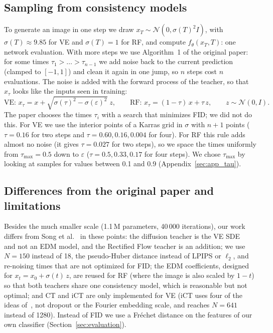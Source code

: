 \documentclass{article}
\begin{document}
\subsection{Sampling from consistency models}
\label{sec:sampling}

To generate an image in one step we draw $x_T \sim \mathcal{N}(0, \sigma(T)^2 I)$,
with $\sigma(T) \approx 9.85$ for VE and $\sigma(T) = 1$ for RF, and compute
$f_\theta(x_T, T)$: one network evaluation. With more steps we use Algorithm~1 of
the original paper: for some times $\tau_1 > \dots > \tau_{n-1}$ we add noise back
to the current prediction (clamped to $[-1, 1]$) and clean it again in one jump,
so $n$ steps cost $n$ evaluations. The noise is added with the forward process of
the teacher, so that $x_\tau$ looks like the inputs seen in training:
\begin{equation}
  \text{VE: } x_\tau = x + \sqrt{\sigma(\tau)^2 - \sigma(\varepsilon)^2}\; z,
  \qquad
  \text{RF: } x_\tau = (1 - \tau)\, x + \tau\, z,
  \qquad z \sim \mathcal{N}(0, I).
\end{equation}
The paper chooses the times $\tau_i$ with a search that minimizes FID; we did not
do this. For VE we use the interior points of a Karras grid in $\sigma$ with
$n + 1$ points ($\tau = 0.16$ for two steps and $\tau = 0.60, 0.16, 0.004$ for
four). For RF this rule adds almost no noise (it gives $\tau = 0.027$ for two
steps), so we space the times uniformly from $\tau_\text{max} = 0.5$ down to
$\varepsilon$ ($\tau = 0.5, 0.33, 0.17$ for four steps). We chose
$\tau_\text{max}$ by looking at samples for values between 0.1 and 0.9
(Appendix~\ref{sec:app_tau}).

\subsection{Differences from the original paper and limitations}
\label{sec:differences}

Besides the much smaller scale (1.1\,M parameters, 40\,000 iterations), our work
differs from Song et al.~\cite{song2023consistency} in these points: the
diffusion teacher is the VE SDE~\cite{song2021sde} and not an EDM model, and the
Rectified Flow teacher is an addition; we use $N = 150$ instead of 18, the
pseudo-Huber distance instead of LPIPS or $\ell_2$, and re-noising times that are
not optimized for FID; the EDM coefficients, designed for
$x_t = x_0 + \sigma(t)\, z$, are reused for RF (where the image is also scaled by
$1 - t$) so that both teachers share one consistency model, which is reasonable
but not optimal; and CT and iCT are only implemented for VE (iCT uses four of the
ideas of~\cite{song2024improved}, not dropout or the Fourier embedding scale, and
reaches $N = 641$ instead of 1280). Instead of FID we use a Fréchet distance on
the features of our own classifier (Section~\ref{sec:evaluation}).
\end{document}
